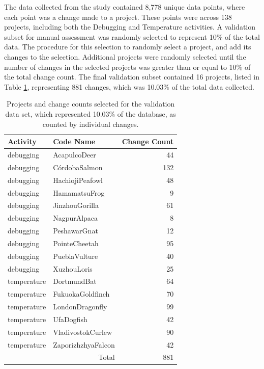 The data collected from the study contained 8,778 unique data points, where each point was a change made to a project. These points were across 138 projects, including both the Debugging and Temperature activities. A validation subset for manual assessment was randomly selected to represent 10\% of the total data. The procedure for this selection to randomly select a project, and add its changes to the selection. Additional projects were randomly selected until the number of changes in the selected projects was greater than or equal to 10\% of the total change count. The final validation subset contained 16 projects, listed in Table \ref{tab:selected-projects}, representing 881 changes, which was 10.03\% of the total data collected.

\begin{table}
\begin{centering}
\begin{tabular}{l l r}
	Activity & Code Name & Change Count \\ \hline
	debugging & AcapulcoDeer & 44\\
	debugging & CórdobaSalmon & 132\\
	debugging & HachiojiPeafowl & 48\\
	debugging & HamamatsuFrog & 9\\
	debugging & JinzhouGorilla & 61\\
	debugging & NagpurAlpaca & 8\\
	debugging & PeshawarGnat & 12\\
	debugging & PointeCheetah & 95\\
	debugging & PueblaVulture & 40\\
	debugging & XuzhouLoris & 25 \\
	temperature & DortmundBat & 64\\
	temperature & FukuokaGoldfinch & 70 \\
	temperature & LondonDragonfly & 99 \\
	temperature & UfaDogfish & 42\\
	temperature & VladivostokCurlew & 90 \\
	temperature & ZaporizhzhyaFalcon & 42 \\ \hline
	\multicolumn{2}{r}{Total} & 881
\end{tabular}
\caption[Projects and Change Counts Selected for the Validation Data Set]{Projects and change counts selected for the validation data set, which represented 10.03\% of the database, as counted by individual changes.}
\label{tab:selected-projects}
\end{centering}
\end{table}

